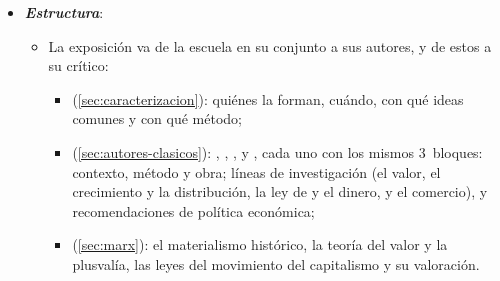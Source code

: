 \documentclass[11pt]{article}
\begin{document}
\begin{itemize}
\item \textbf{\emph{Estructura}}:
  \begin{itemize}
  \item La exposición va de la escuela en su conjunto a sus autores, y de estos a su crítico:
  \begin{itemize}
  \item {} (\ref{sec:caracterizacion}): quiénes la forman, cuándo, con qué ideas comunes y con qué método;
  \item {} (\ref{sec:autores-clasicos}): , , ,  y , cada uno con los mismos 3~bloques: contexto, método y obra; líneas de investigación (el valor, el crecimiento y la distribución, la ley de  y el dinero, y el comercio), y recomendaciones de política económica;
  \item {} (\ref{sec:marx}): el materialismo histórico, la teoría del valor y la plusvalía, las leyes del movimiento del capitalismo y su valoración.
  \end{itemize}
  \end{itemize}
\end{itemize}
\end{document}
